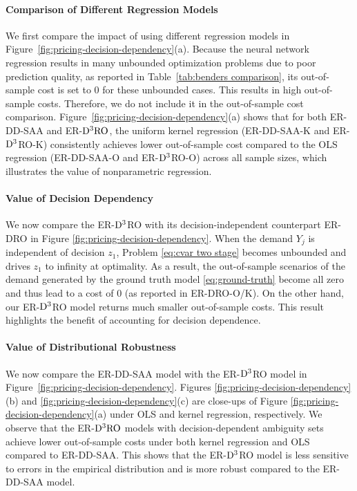 \documentclass[onefignum,onetabnum]{siamart251216}
\begin{document}
\paragraph{Comparison of Different Regression Models}
We first compare the impact of using different regression models in Figure\ \ref{fig:pricing-decision-dependency}(a). Because the neural network regression results in many unbounded optimization problems due to poor prediction quality, as reported in Table\ \ref{tab:benders comparison}, its out-of-sample cost is set to 0 for these unbounded cases. This results in high out-of-sample costs. Therefore, we do not include it in the out-of-sample cost comparison.
Figure\ \ref{fig:pricing-decision-dependency}(a) shows that for both ER-DD-SAA and ER-$\rm{D^3RO}$, the uniform kernel regression (ER-DD-SAA-K and ER-${\rm D^3}$RO-K) consistently achieves lower out-of-sample cost compared to the OLS regression (ER-DD-SAA-O and ER-${\rm D^3}$RO-O) across all sample sizes, which illustrates the value of nonparametric regression. 

\paragraph{Value of Decision Dependency}
We now compare the ER-${\rm D^3}$RO with its decision-independent counterpart ER-DRO in Figure \ref{fig:pricing-decision-dependency}. 
When the demand $Y_j$ is independent of decision $z_1$, Problem \eqref{eq:cvar two stage} becomes unbounded and drives $z_1$ to infinity at optimality. As a result, the out-of-sample scenarios of the demand generated by the ground truth model \eqref{eq:ground-truth} become all zero and thus lead to a cost of 0 (as reported in ER-DRO-O/K). On the other hand, our ER-${\rm D^3}$RO model returns much smaller out-of-sample costs. This result highlights the benefit of accounting for decision dependence.

\paragraph{Value of Distributional Robustness}
We now compare the ER-DD-SAA model with the ER-${\rm D^3}$RO model in Figure\ \ref{fig:pricing-decision-dependency}. Figures \ref{fig:pricing-decision-dependency}(b) and \ref{fig:pricing-decision-dependency}(c) are close-ups of Figure \ref{fig:pricing-decision-dependency}(a) under OLS and kernel regression, respectively. We observe that the ER-$\rm{D^3RO}$ models with decision-dependent ambiguity sets achieve lower out-of-sample costs under both kernel regression and OLS compared to ER-DD-SAA. This shows that the ER-${\rm D^3}$RO model is less sensitive to errors in the empirical distribution and is more robust compared to the ER-DD-SAA model.
\end{document}
